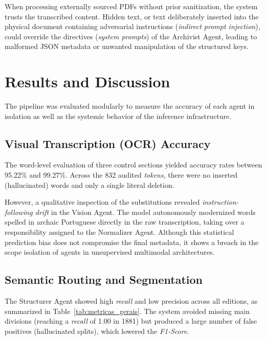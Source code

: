 \documentclass[conference]{IEEEtran}
\begin{document}
When processing externally sourced PDFs without prior sanitization, the system trusts the transcribed content. Hidden text, or text deliberately inserted into the physical document containing adversarial instructions (\textit{indirect prompt injection}), could override the directives (\textit{system prompts}) of the Archivist Agent, leading to malformed JSON metadata or unwanted manipulation of the structured keys.

\section{Results and Discussion}

The pipeline was evaluated modularly to measure the accuracy of each agent in isolation as well as the systemic behavior of the inference infrastructure.

\subsection{Visual Transcription (OCR) Accuracy}

The word-level evaluation of three control sections yielded accuracy rates between 95.22\% and 99.27\%. Across the 832 audited \textit{tokens}, there were no inserted (hallucinated) words and only a single literal deletion.

However, a qualitative inspection of the substitutions revealed \textit{instruction-following drift} in the Vision Agent. The model autonomously modernized words spelled in archaic Portuguese directly in the raw transcription, taking over a responsibility assigned to the Normalizer Agent. Although this statistical prediction bias does not compromise the final metadata, it shows a breach in the scope isolation of agents in unsupervised multimodal architectures.

\subsection{Semantic Routing and Segmentation}

The Structurer Agent showed high \textit{recall} and low precision across all editions, as summarized in Table~\ref{tab:metricas_gerais}. The system avoided missing main divisions (reaching a \textit{recall} of 1.00 in 1881) but produced a large number of false positives (hallucinated splits), which lowered the \textit{F1-Score}.
\end{document}
